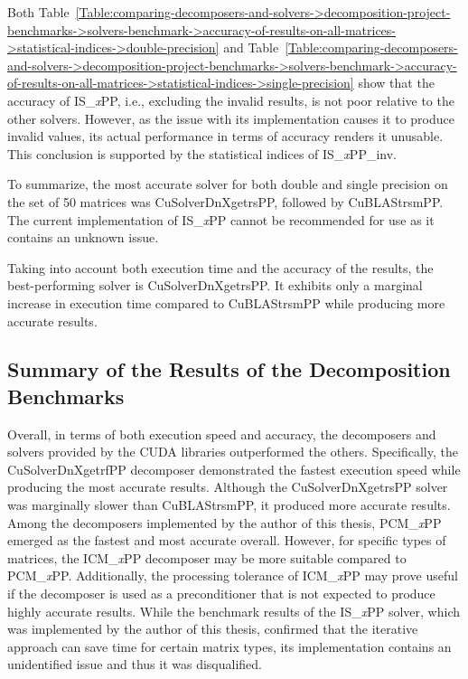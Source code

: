 Both Table~\ref{Table:comparing-decomposers-and-solvers->decomposition-project-benchmarks->solvers-benchmark->accuracy-of-results-on-all-matrices->statistical-indices->double-precision} and Table~\ref{Table:comparing-decomposers-and-solvers->decomposition-project-benchmarks->solvers-benchmark->accuracy-of-results-on-all-matrices->statistical-indices->single-precision} show that the accuracy of IS\_\textit{x}PP, i.e., excluding the invalid results, is not poor relative to the other solvers.
However, as the issue with its implementation causes it to produce invalid values, its actual performance in terms of accuracy renders it unusable.
This conclusion is supported by the statistical indices of IS\_\textit{x}PP\_inv.

To summarize, the most accurate solver for both double and single precision on the set of 50 matrices was CuSolverDnXgetrsPP, followed by CuBLAStrsmPP.
The current implementation of IS\_\textit{x}PP cannot be recommended for use as it contains an unknown issue.

Taking into account both execution time and the accuracy of the results, the best-performing solver is CuSolverDnXgetrsPP.
It exhibits only a marginal increase in execution time compared to CuBLAStrsmPP while producing more accurate results.

\subsection{Summary of the Results of the Decomposition Benchmarks}\label{Subsection:comparing-decomposers-and-solvers->decomposition-project-benchmarks->solvers-benchmark->summary-of-results-of-decomposition-benchmarks}
Overall, in terms of both execution speed and accuracy, the decomposers and solvers provided by the CUDA libraries outperformed the others.
Specifically, the CuSolverDnXgetrfPP decomposer demonstrated the fastest execution speed while producing the most accurate results.
Although the CuSolverDnXgetrsPP solver was marginally slower than CuBLAStrsmPP, it produced more accurate results.
Among the decomposers implemented by the author of this thesis, PCM\_\textit{x}PP emerged as the fastest and most accurate overall.
However, for specific types of matrices, the ICM\_\textit{x}PP decomposer may be more suitable compared to PCM\_\textit{x}PP.
Additionally, the processing tolerance of ICM\_\textit{x}PP may prove useful if the decomposer is used as a preconditioner that is not expected to produce highly accurate results.
While the benchmark results of the IS\_\textit{x}PP solver, which was implemented by the author of this thesis, confirmed that the iterative approach can save time for certain matrix types, its implementation contains an unidentified issue and thus it was disqualified.




